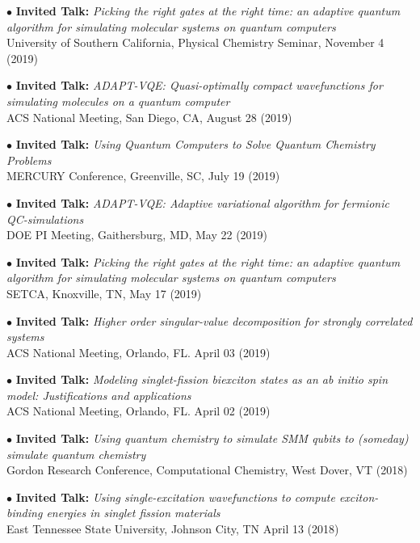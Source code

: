 \documentclass[10pt]{article}
\newenvironment{lonelist}[1][\enskip\textbullet]%
        {\vspace{-\baselineskip}\begin{list}{#1}{%
        \setlength{\partopsep}{0pt}%
        \setlength{\topsep}{0pt}}}
        {\end{list}\vspace{-.6\baselineskip}}
\begin{document}
\begin{lonelist}
\item[$\bullet$] \textbf{Invited Talk:} \textit{Picking the right gates at the right time: an adaptive quantum algorithm for
simulating molecular systems on quantum computers}\\
University of Southern California, Physical Chemistry Seminar, November 4 (2019)

\item[$\bullet$] \textbf{Invited Talk:} \textit{ADAPT-VQE: Quasi-optimally compact wavefunctions for simulating molecules on a quantum computer}\\
ACS National Meeting, San Diego, CA, August 28 (2019)

\item[$\bullet$] \textbf{Invited Talk:} \textit{Using Quantum Computers to Solve Quantum Chemistry Problems}\\
MERCURY Conference, Greenville, SC, July 19 (2019)

\item[$\bullet$] \textbf{Invited Talk:} \textit{ADAPT-VQE: Adaptive variational algorithm for fermionic QC-simulations}\\
DOE PI Meeting, Gaithersburg, MD, May 22 (2019)

\item[$\bullet$] \textbf{Invited Talk:} \textit{Picking the right gates at the right time: an adaptive quantum algorithm for simulating molecular systems on quantum computers}\\
SETCA, Knoxville, TN, May 17 (2019)

\item[$\bullet$] \textbf{Invited Talk:} \textit{Higher order singular-value decomposition for strongly correlated systems}\\
ACS National Meeting, Orlando, FL. April 03 (2019)

\item[$\bullet$] \textbf{Invited Talk:} \textit{Modeling singlet-fission biexciton states as an ab initio spin model: Justifications and applications}\\
ACS National Meeting, Orlando, FL. April 02 (2019)

\item[$\bullet$] \textbf{Invited Talk:} \textit{Using quantum chemistry to simulate SMM qubits to (someday) simulate quantum chemistry}\\
Gordon Research Conference, Computational Chemistry, West Dover, VT (2018)

\item[$\bullet$] \textbf{Invited Talk:} \textit{Using single-excitation wavefunctions to compute exciton-binding energies in singlet fission materials}\\
East Tennessee State University, Johnson City, TN  April 13 (2018)


\end{lonelist}
\end{document}
